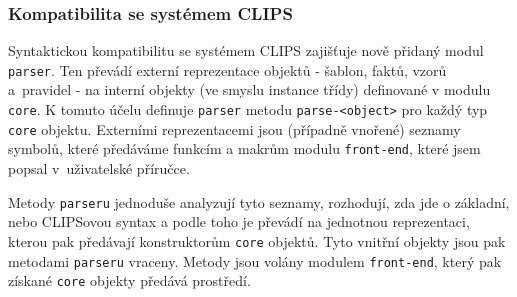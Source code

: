 \subsubsection{Kompatibilita se systémem CLIPS}
Syntaktickou kompatibilitu se systémem CLIPS zajišťuje nově přidaný modul
\verb|parser|. Ten převádí externí reprezentace objektů - šablon, faktů, vzorů
a~pravidel - na interní objekty (ve smyslu instance třídy) definované v modulu
\verb|core|. K tomuto účelu definuje \verb|parser| metodu \verb|parse-<object>|
pro každý typ \verb|core| objektu. Externími reprezentacemi jsou (případně
vnořené) seznamy symbolů, které předáváme funkcím a makrům modulu
\verb|front-end|, které jsem popsal v~uživatelské příručce.

Metody \verb|parseru| jednoduše analyzují tyto seznamy, rozhodují, zda jde o
základní, nebo CLIPSovou syntax a podle toho je převádí na jednotnou
reprezentaci, kterou pak předávají konstruktorům \verb|core| objektů. Tyto
vnitřní objekty jsou pak metodami \verb|parseru| vraceny. Metody jsou volány
modulem \verb|front-end|, který pak získané \verb|core| objekty předává
prostředí.
